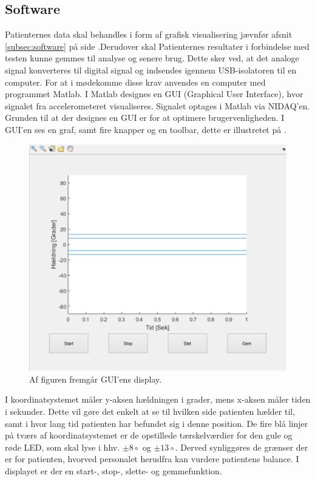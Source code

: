 \subsection{Software}
Patienternes data skal behandles i form af grafisk visualisering jævnfør afsnit \ref{subsec:software} på side \pageref{subsec:software}.Derudover skal Patienternes resultater i forbindelse med testen kunne gemmes til analyse og senere brug. Dette sker ved, at det analoge signal konverteres til digital signal og indsendes igennem USB-isolatoren til en computer. For at i mødekomme disse krav anvendes en computer med programmet Matlab. I Matlab designes en GUI (Graphical User Interface), hvor signalet fra accelerometeret visualiseres. Signalet optages i Matlab via NIDAQ'en. Grunden til at der designes en GUI er for at optimere brugervenligheden. I GUI'en ses en graf, samt fire knapper og en toolbar, dette er illustretet på . 
\begin{figure}[H] 
	\centering 
	\includegraphics[scale=0.5]{figures/cProblemloesning/GUI_generisk.PNG}
	\caption{Af figuren fremgår GUI'ens display.}
	\label{Fig:GUI_generisk}
\end{figure} 
I koordinatsystemet måler y-aksen hældningen i grader, mens x-aksen måler tiden i sekunder. Dette vil gøre det enkelt at se til hvilken side patienten hælder til, samt i hvor lang tid patienten har befundet sig i denne position.
De fire blå linjer på tværs af koordinatsystemet er de opstillede tærskelværdier for den gule og røde LED, som skal lyse i hhv. $\pm 8\circ$ og $\pm 13\circ$. Derved synliggøres de grænser der er for patienten, hvorved personalet herudfra kan vurdere patientens balance. I displayet er der en start-, stop-, slette- og gemmefunktion.
